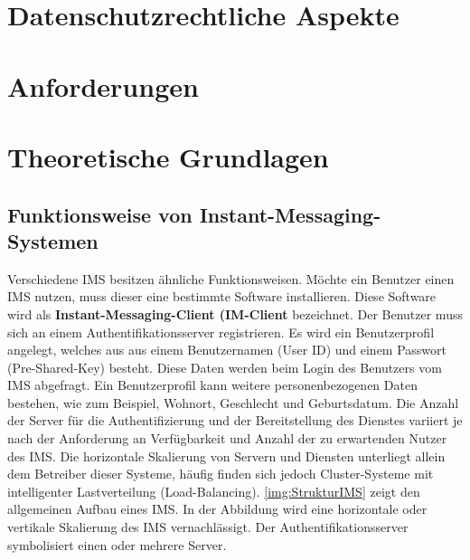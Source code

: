\documentclass[a4paper,titlepage,halfparskip,12pt]{scrreprt}
\begin{document}
\begin{onehalfspacing}
\chapter{Datenschutzrechtliche Aspekte}
\label{chap:Datenschutz}

\newpage

\chapter{Anforderungen}
\label{Anforderungen}

\newpage

\chapter{Theoretische Grundlagen}
\label{chap:Theorie}

\section{Funktionsweise von Instant-Messaging-Systemen}
\label{sec:IMSFunktion}

Verschiedene \ac{IMS} besitzen ähnliche Funktionsweisen. Möchte ein Benutzer einen \ac{IMS} nutzen, muss dieser eine bestimmte Software installieren. Diese Software wird als \textbf{Instant-Messaging-Client (IM-Client} bezeichnet. Der Benutzer muss sich an einem Authentifikationsserver registrieren. Es wird ein Benutzerprofil angelegt, welches aus aus einem Benutzernamen (User ID) und einem Passwort (Pre-Shared-Key) besteht. Diese Daten werden beim Login des Benutzers vom \ac{IMS} abgefragt. Ein Benutzerprofil kann weitere personenbezogenen Daten bestehen, wie zum Beispiel, Wohnort, Geschlecht und Geburtsdatum. Die Anzahl der Server für die Authentifizierung und der Bereitstellung des Dienstes variiert je nach der Anforderung an Verfügbarkeit und Anzahl der zu erwartenden Nutzer des \ac{IMS}. Die horizontale Skalierung von Servern und Diensten unterliegt allein dem Betreiber dieser Systeme, häufig finden sich jedoch Cluster-Systeme mit intelligenter Lastverteilung (Load-Balancing). \autoref{img:StrukturIMS} zeigt den allgemeinen Aufbau eines \ac{IMS}. In der Abbildung wird eine horizontale oder vertikale Skalierung des \ac{IMS} vernachlässigt. Der Authentifikationsserver symbolisiert einen oder mehrere Server.\cite{anastasiaIMS}


\end{onehalfspacing}
\end{document}
